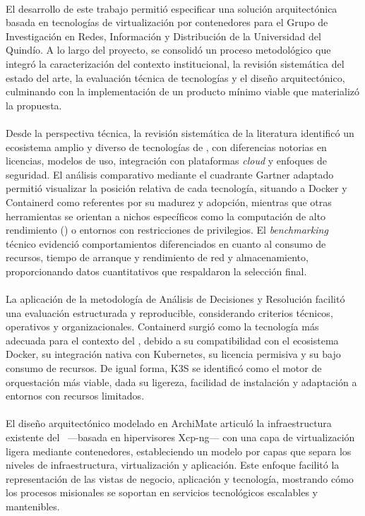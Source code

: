 \label{cap:conclusiones}
\mbox{}\\
\noindent
El desarrollo de este trabajo permitió especificar una solución arquitectónica basada en tecnologías de virtualización por contenedores para el Grupo de Investigación en Redes, Información y Distribución de la Universidad del Quindío. A lo largo del proyecto, se consolidó un proceso metodológico que integró la caracterización del contexto institucional, la revisión sistemática del estado del arte, la evaluación técnica de tecnologías y el diseño arquitectónico, culminando con la implementación de un producto mínimo viable que materializó la propuesta.\\ \\
\noindent
Desde la perspectiva técnica, la revisión sistemática de la literatura identificó un ecosistema amplio y diverso de tecnologías de \VBC, con diferencias notorias en licencias, modelos de uso, integración con plataformas \textit{cloud} y enfoques de seguridad. El análisis comparativo mediante el cuadrante Gartner adaptado permitió visualizar la posición relativa de cada tecnología, situando a Docker y Containerd como referentes por su madurez y adopción, mientras que otras herramientas se orientan a nichos específicos como la computación de alto rendimiento (\HPC) o entornos con restricciones de privilegios. El \textit{benchmarking} técnico evidenció comportamientos diferenciados en cuanto al consumo de recursos, tiempo de arranque y rendimiento de red y almacenamiento, proporcionando datos cuantitativos que respaldaron la selección final.\\ \\
\noindent
La aplicación de la metodología de Análisis de Decisiones y Resolución facilitó una evaluación estructurada y reproducible, considerando criterios técnicos, operativos y organizacionales. Containerd surgió como la tecnología más adecuada para el contexto del \GRID, debido a su compatibilidad con el ecosistema Docker, su integración nativa con Kubernetes, su licencia permisiva y su bajo consumo de recursos. De igual forma, K3S se identificó como el motor de orquestación más viable, dada su ligereza, facilidad de instalación y adaptación a entornos con recursos limitados.\\ \\
\noindent
El diseño arquitectónico modelado en ArchiMate articuló la infraestructura existente del \GRID\ —basada en hipervisores Xcp-ng— con una capa de virtualización ligera mediante contenedores, estableciendo un modelo por capas que separa los niveles de infraestructura, virtualización y aplicación. Este enfoque facilitó la representación de las vistas de negocio, aplicación y tecnología, mostrando cómo los procesos misionales se soportan en servicios tecnológicos escalables y mantenibles.\\ \\
